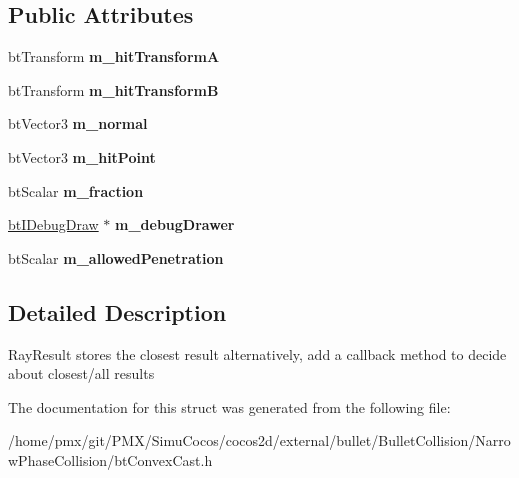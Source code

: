 \subsection*{Public Attributes}
\begin{DoxyCompactItemize}
\item 
\mbox{\label{structbtConvexCast_1_1CastResult_a5bc7b0d3dcded6583c57ced03e08dffb}} 
bt\+Transform {\bfseries m\+\_\+hit\+TransformA}
\item 
\mbox{\label{structbtConvexCast_1_1CastResult_acb5af7677af5f71ae38002c7b08d5f88}} 
bt\+Transform {\bfseries m\+\_\+hit\+TransformB}
\item 
\mbox{\label{structbtConvexCast_1_1CastResult_a148656b35ce0209617a5f65d60260e5b}} 
bt\+Vector3 {\bfseries m\+\_\+normal}
\item 
\mbox{\label{structbtConvexCast_1_1CastResult_acb26f2da1eff229db573667b6a415aab}} 
bt\+Vector3 {\bfseries m\+\_\+hit\+Point}
\item 
\mbox{\label{structbtConvexCast_1_1CastResult_a4685e4b6ea1dd8acc76738986555874a}} 
bt\+Scalar {\bfseries m\+\_\+fraction}
\item 
\mbox{\label{structbtConvexCast_1_1CastResult_a4394362a80ca76b1bb2e0f6f2d00caf9}} 
\hyperlink{classbtIDebugDraw}{bt\+I\+Debug\+Draw} $\ast$ {\bfseries m\+\_\+debug\+Drawer}
\item 
\mbox{\label{structbtConvexCast_1_1CastResult_abb06d78a6878f231ab30a4e112d16781}} 
bt\+Scalar {\bfseries m\+\_\+allowed\+Penetration}
\end{DoxyCompactItemize}


\subsection{Detailed Description}
Ray\+Result stores the closest result alternatively, add a callback method to decide about closest/all results 

The documentation for this struct was generated from the following file\+:\begin{DoxyCompactItemize}
\item 
/home/pmx/git/\+P\+M\+X/\+Simu\+Cocos/cocos2d/external/bullet/\+Bullet\+Collision/\+Narrow\+Phase\+Collision/bt\+Convex\+Cast.\+h\end{DoxyCompactItemize}
